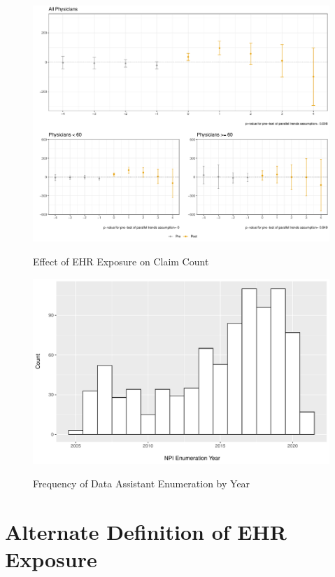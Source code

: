 \documentclass[11pt]{article}
\begin{document}
\begin{figure}[p]
    \centering
    \caption{Effect of EHR Exposure on Claim Count}
    \includegraphics[scale=.57]{Objects/claim_plot.pdf}
    \label{fig:claim}
\end{figure}

\begin{figure}[p]
\centering
\caption{Frequency of Data Assistant Enumeration by Year}
\includegraphics[scale=.5]{Objects/dataassistant_histogram.pdf}
\label{fig:dataassistant_histogram}
\end{figure}

\clearpage


\appendix

\section{Alternate Definition of EHR Exposure}









\clearpage


\renewcommand*{\bibfont}{\footnotesize}

\printbibliography
\end{document}
